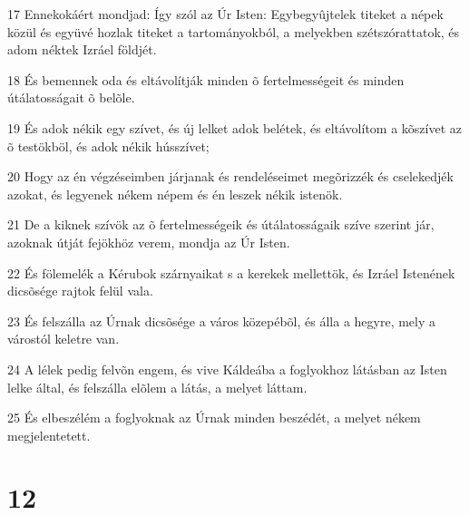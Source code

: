 \par 17 Ennekokáért mondjad: Így szól az Úr Isten: Egybegyûjtelek titeket a népek közül és együvé hozlak titeket a tartományokból, a melyekben szétszórattatok, és adom néktek Izráel földjét.
\par 18 És bemennek oda és eltávolítják minden õ fertelmességeit és minden útálatosságait õ belõle.
\par 19 És adok nékik egy szívet, és új lelket  adok belétek, és eltávolítom a kõszívet az õ testökböl, és adok nékik hússzívet;
\par 20 Hogy az én végzéseimben járjanak és rendeléseimet megõrizzék és cselekedjék azokat, és legyenek nékem népem és én leszek nékik istenök.
\par 21 De a kiknek szívök az õ fertelmességeik és útálatosságaik szíve szerint jár, azoknak útját fejökhöz verem, mondja az Úr Isten.
\par 22 És fölemelék a Kérubok szárnyaikat s a kerekek mellettök, és Izráel Istenének dicsõsége rajtok felül vala.
\par 23 És felszálla az Úrnak dicsõsége a város közepébõl, és álla a hegyre, mely a várostól keletre van.
\par 24 A lélek pedig felvõn engem, és vive Káldeába a foglyokhoz látásban az Isten lelke által, és felszálla elõlem a látás, a melyet láttam.
\par 25 És elbeszélém a foglyoknak az Úrnak minden beszédét, a melyet nékem megjelentetett.

\chapter{12}


